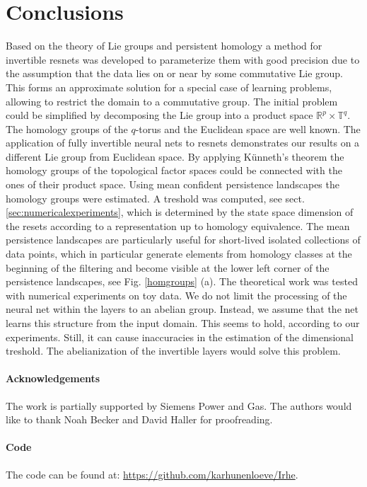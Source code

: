\documentclass[envcountsect,runningheads]{llncs}
\begin{document}
\section{Conclusions}
\label{sec:conclusion}
Based on the theory of Lie groups and persistent homology a method for invertible resnets was developed to parameterize them with good precision due to the assumption that the data lies on or near by some commutative Lie group. This forms an approximate solution for a special case of learning problems, allowing to restrict the domain to a commutative group. The initial problem could be simplified by decomposing the Lie group into a product space $\mathbb{R}^p \times \mathbb{T}^q$. The homology groups of the $q$-torus and the Euclidean space are well known. The application of fully invertible neural nets to resnets demonstrates our results on a different Lie group from Euclidean space. By applying Künneth's theorem the homology groups of the topological factor spaces could be connected with the ones of their product space. Using mean confident persistence landscapes the homology groups were estimated. A treshold was computed, see sect. \ref{sec:numericalexperiments}, which is determined by the state space dimension of the resets according to a representation up to homology equivalence. The mean persistence landscapes are particularly useful for short-lived isolated collections of data points, which in particular generate elements from homology classes at the beginning of the filtering and become visible at the lower left corner of the persistence landscapes, see Fig. \ref{homgroups} (a). The theoretical work was tested with numerical experiments on toy data. We do not limit the processing of the neural net within the layers to an abelian group. Instead, we assume that the net learns this structure from the input domain. This seems to hold, according to our experiments. Still, it can cause inaccuracies in the estimation of the dimensional treshold. The abelianization of the invertible layers would solve this problem.

\paragraph{Acknowledgements} The work is partially supported by Siemens Power and Gas. The authors would like to thank Noah Becker and David Haller for proofreading.

\paragraph{Code} The code can be found at: \href{https://github.com/karhunenloeve/Irhe}{https://github.com/karhunenloeve/Irhe}.
%
%
%
%
%
%
%
\newpage
\appendix
\end{document}
